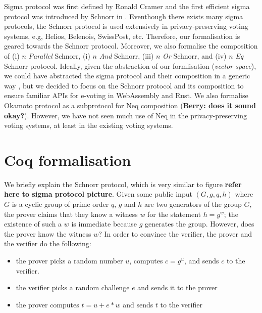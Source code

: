 \documentclass[conference,compsoc]{IEEEtran}
\begin{document}
Sigma protocol was first defined by Ronald Cramer \cite{cramer1996modular} 
and the first efficient sigma protocol was introduced by Schnorr in \cite{schnorr1991efficient}. 
Eventhough there exists many sigma protocols, the Schnorr protocol is used extensively in privacy-preserving voting systems, e.g, Helios, Belenois, SwissPost, etc. Therefore, 
our formalisation is geared towards the Schnorr protocol. 
Moreover, we also formalise the composition of (i) $n$ \textit{Parallel} Schnorr, 
(i) $n$ \textit{And} Schnorr, (iii) $n$ \textit{Or} Schnorr, and (iv) $n$ \textit{Eq} Schnorr protocol. 
Ideally, given the abstraction of our formlisation (\textit{vector space}), we could have 
abstracted the sigma protocol and their composition in a generic way \cite{10.1007/978-3-642-02384-2_17},
but we decided to focus on the Schnorr protocol and its composition to ensure familiar APIs 
for e-voting in WebAssembly and Rust. We also formalise Okamoto protocol as a subprotocol 
for Neq composition (\textbf{Berry: does it sound okay?}). However, we have not seen 
much use of Neq in the privacy-preserving voting systems, at least in the existing voting systems. 






\section{Coq formalisation}

  We briefly explain the Schnorr protocol, which is very similar to figure \textbf{refer here to sigma protocol picture}.
  Given some public input $(G, g, q, h)$ where $G$
  is a cyclic group of prime order $q$, $g$ and $h$ are two 
  generators of the group $G$, the prover claims that they know a
  witness $w$ for the statement $h = g^w$; the existence of such
  a $w$ is immediate because $g$ generates the group. However,
  does the prover know the witness $w$? In order to convince the
  verifier, the prover and the verifier do the following:
  \begin{itemize}
    \item the prover picks a random number $u$, computes $c = g^u$,
    and sends $c$ to the verifier.
    \item the verifier picks a random challenge $e$ and sends it to
    the prover
    \item the prover computes $t = u + e * w$ and sends $t$ to the
    verifier
  \end{itemize}
\end{document}
